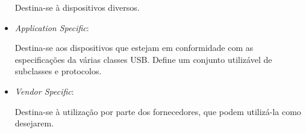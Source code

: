 \begin{itemize}
	Destina-se à dispositivos diversos.
	\item \emph{Application Specific}:

	Destina-se aos dispositivos que estejam em conformidade com as especificações da várias classes USB. Define um conjunto utilizável de subclasses e protocolos.
	\item \emph{Vendor Specific}:

	Destina-se à utilização por parte dos fornecedores, que podem utilizá-la como desejarem.
\end{itemize}

